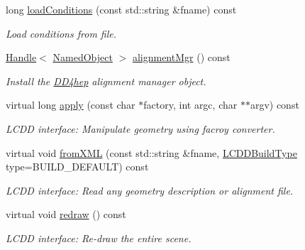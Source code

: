 \begin{DoxyCompactItemize}
long \hyperlink{class_d_d4hep_1_1_r_o_o_t_u_i_a01bf0e443e30c09a85381461d9cc5f5a}{loadConditions} (const std::string \&fname) const 
\begin{DoxyCompactList}\small\item\em Load conditions from file. \item\end{DoxyCompactList}\item 
\hyperlink{class_d_d4hep_1_1_handle}{Handle}$<$ \hyperlink{class_d_d4hep_1_1_named_object}{NamedObject} $>$ \hyperlink{class_d_d4hep_1_1_r_o_o_t_u_i_ad04f23bceb40da60a17096f5f7e366e0}{alignmentMgr} () const 
\begin{DoxyCompactList}\small\item\em Install the \hyperlink{namespace_d_d4hep}{DD4hep} alignment manager object. \item\end{DoxyCompactList}\item 
virtual long \hyperlink{class_d_d4hep_1_1_r_o_o_t_u_i_a5c59ec6627aef8074bf2cf5bb7b82ec6}{apply} (const char $\ast$factory, int argc, char $\ast$$\ast$argv) const 
\begin{DoxyCompactList}\small\item\em LCDD interface: Manipulate geometry using facroy converter. \item\end{DoxyCompactList}\item 
virtual void \hyperlink{class_d_d4hep_1_1_r_o_o_t_u_i_add5b84b3c19270a94e7c23d6bf7e3692}{fromXML} (const std::string \&fname, \hyperlink{namespace_d_d4hep_acafe43ba4537ab6e999e808142965fab}{LCDDBuildType} type=BUILD\_\-DEFAULT) const 
\begin{DoxyCompactList}\small\item\em LCDD interface: Read any geometry description or alignment file. \item\end{DoxyCompactList}\item 
virtual void \hyperlink{class_d_d4hep_1_1_r_o_o_t_u_i_ab7154426f968621a5b8ad26b57716fec}{redraw} () const 
\begin{DoxyCompactList}\small\item\em LCDD interface: Re-\/draw the entire scene. \item\end{DoxyCompactList}\end{DoxyCompactItemize}
